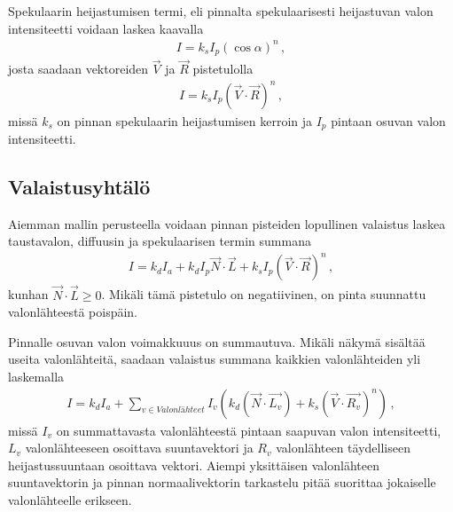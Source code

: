 \documentclass[finnish]{tktltiki2}
\theoremstyle{definition}
\theoremstyle{remark}
\begin{document}
Spekulaarin heijastumisen termi, eli pinnalta spekulaarisesti heijastuvan valon intensiteetti voidaan laskea kaavalla
\begin{align*}
I = k_sI_p(\cos\alpha)^n\,,
\end{align*}
josta saadaan vektoreiden $\vec{V}$ ja $\vec{R}$ pistetulolla
\begin{align*}
I = k_sI_p(\vec{V}\cdot\vec{R})^n\,,
\end{align*}
missä $k_s$ on pinnan spekulaarin heijastumisen kerroin ja $I_p$ pintaan osuvan valon intensiteetti.

\subsection{Valaistusyhtälö}
Aiemman mallin perusteella voidaan pinnan pisteiden lopullinen valaistus laskea taustavalon, diffuusin ja spekulaarisen termin summana
\begin{align*}
I = k_dI_a + k_dI_p\vec{N}\cdot\vec{L} + k_sI_p(\vec{V}\cdot\vec{R})^n\,,
\end{align*}
kunhan $\vec{N}\cdot\vec{L} \ge 0$. Mikäli tämä pistetulo on negatiivinen, on pinta suunnattu valonlähteestä poispäin.

Pinnalle osuvan valon voimakkuuus on summautuva. Mikäli näkymä sisältää useita valonlähteitä, saadaan valaistus summana kaikkien valonlähteiden yli laskemalla
\begin{align*}
I = k_dI_a + \sum\nolimits_{v \in Valonlähteet}I_v(k_d(\vec{N}\cdot\vec{L_v}) + k_s(\vec{V}\cdot\vec{R_v})^n)\,,
\end{align*}
missä $I_v$ on summattavasta valonlähteestä pintaan saapuvan valon intensiteetti, $L_v$ valonlähteeseen osoittava suuntavektori ja $R_v$ valonlähteen täydelliseen heijastussuuntaan osoittava vektori. Aiempi yksittäisen valonlähteen suuntavektorin ja pinnan normaalivektorin tarkastelu pitää suorittaa jokaiselle valonlähteelle erikseen.
\end{document}
